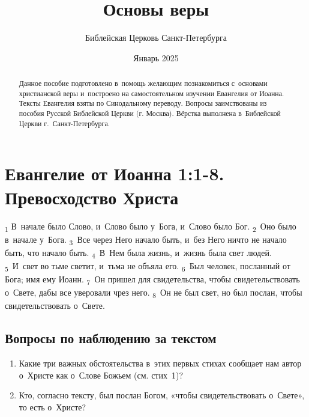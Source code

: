 \documentclass[a4paper,12pt]{article}
\title{Основы веры}
\author{Библейская Церковь Санкт-Петербурга}
\date{Январь 2025}
\begin{document}
\maketitle

\thispagestyle{empty}

\begin{abstract}
    Данное пособие подготовлено в~помощь желающим познакомиться с~основами христианской веры и~построено на самостоятельном изучении Евангелия от Иоанна. Тексты Евангелия взяты по Синодальному переводу. Вопросы заимствованы из пособия Русской Библейской Церкви (г. Москва). Вёрстка выполнена в~Библейской Церкви г.\ Санкт-Петербурга.
\end{abstract}

\newpage

\tableofcontents


\newcommand{\myline}{\noindent\makebox[\linewidth]{\rule{\linewidth}{0.1pt}}}

\section{Евангелие от Иоанна 1:1-8. Превосходство Христа}

\textsubscript{1} В~начале было Слово, и~Слово было у~Бога, и~Слово было Бог. \textsubscript{2}~Оно было в~начале у~Бога. \textsubscript{3}~Все через Него начало быть, и~без Него ничто не начало быть, что начало быть. \textsubscript{4}~В~Нем была жизнь, и~жизнь была свет людей. \textsubscript{5}~И~свет во тьме светит, и~тьма не объяла его. \textsubscript{6}~Был человек, посланный от Бога; имя ему Иоанн. \textsubscript{7}~Он пришел для свидетельства, чтобы свидетельствовать о~Свете, дабы все уверовали чрез него. \textsubscript{8}~Он не был свет, но был послан, чтобы свидетельствовать о~Свете.

\subsection*{Вопросы по наблюдению за текстом}
\begin{enumerate}
    \item Какие три важных обстоятельства в~этих первых стихах сообщает нам автор о~Христе как о~Слове Божьем (см. стих~1)? 
    
    \myline

    \myline

    \myline
    
    \item Кто, согласно тексту, был послан Богом, «чтобы свидетельствовать о~Свете», то есть о~Христе?
    
    \myline

\end{enumerate}
\end{document}
